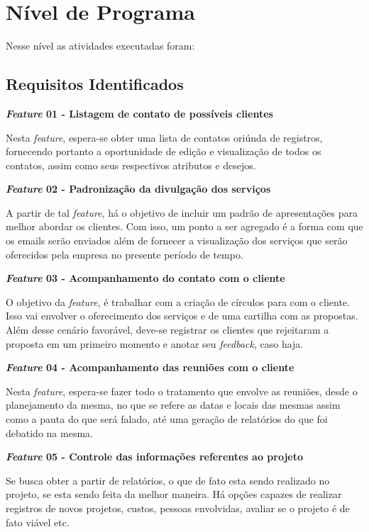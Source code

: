 \chapter[Nível de Programa]{Nível de Programa}
Nesse nível as atividades executadas foram:


\section{Requisitos Identificados}

\textbf{\textit{Feature} 01 - Listagem de contato de possíveis clientes}

Nesta \textit{feature}, espera-se obter uma lista de contatos oriúnda de registros, fornecendo portanto a oportunidade de edição e visualização de todos os contatos, assim como seus respectivos atributos e desejos.


\textbf{\textit{Feature} 02 - Padronização da divulgação dos serviços}

A partir de tal \textit{feature}, há o objetivo de incluir um padrão de apresentações para melhor abordar os clientes. Com isso, um ponto a ser agregado é a forma com que os emails serão enviados além de fornecer a visualização dos serviços que serão oferecidos pela empresa no presente período de tempo.


\textbf{\textit{Feature} 03 - Acompanhamento do contato com o cliente}

O objetivo da \textit{feature}, é trabalhar com a criação de círculos para com o cliente. Isso vai envolver o oferecimento dos serviços e de uma cartilha com as propostas. Além desse cenário favorável, deve-se registrar os clientes que rejeitaram a proposta em um primeiro momento e anotar seu \textit{feedback}, caso haja.


\textbf{\textit{Feature} 04 - Acompanhamento das reuniões com o cliente}

Nesta \textit{feature}, espera-se fazer todo o tratamento que envolve as reuniões, desde o planejamento da mesma, no que se refere as datas e locais das mesmas assim como a pauta do que será falado, até uma geração de relatórios do que foi debatido na mesma.		


\textbf{\textit{Feature} 05 - Controle das informações referentes ao projeto}

Se busca obter a partir de relatórios, o que de fato esta sendo realizado no projeto, se esta sendo feita da melhor maneira. Há opções capazes de realizar registros de novos projetos, custos, pessoas envolvidas, avaliar se o projeto é de fato viável etc.

